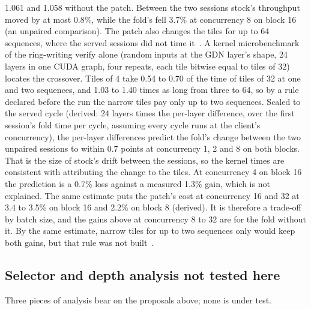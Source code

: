 1.061 and 1.058 without the patch. Between the two sessions stock's throughput moved by at most 0.8\%, while the fold's fell 3.7\% at concurrency 8 on block 16 (an unpaired comparison). The patch also changes the tiles for up to 64 sequences, where the served sessions did not time it~. A kernel microbenchmark of the ring-writing verify alone (random inputs at the GDN layer's shape, 24 layers in one CUDA graph, four repeats, each tile bitwise equal to tiles of 32) locates the crossover. Tiles of 4 take 0.54 to 0.70 of the time of tiles of 32 at one and two sequences, and 1.03 to 1.40 times as long from three to 64, so by a rule declared before the run the narrow tiles pay only up to two sequences. Scaled to the served cycle (derived: 24 layers times the per-layer difference, over the first session's fold time per cycle, assuming every cycle runs at the client's concurrency), the per-layer differences predict the fold's change between the two unpaired sessions to within 0.7 points at concurrency 1, 2 and 8 on both blocks. That is the size of stock's drift between the sessions, so the kernel times are consistent with attributing the change to the tiles. At concurrency 4 on block 16 the prediction is a 0.7\% loss against a measured 1.3\% gain, which is not explained. The same estimate puts the patch's cost at concurrency 16 and 32 at 3.4 to 3.5\% on block 16 and 2.2\% on block 8 (derived). It is therefore a trade-off by batch size, and the gains above at concurrency 8 to 32 are for the fold without it. By the same estimate, narrow tiles for up to two sequences only would keep both gains, but that rule was not built~.

\subsection{Selector and depth analysis not tested here}\label{app:untested}
Three pieces of analysis bear on the proposals above; none is under test.

